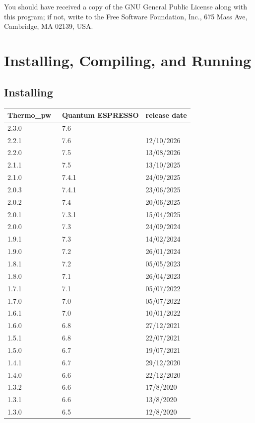 \documentclass[12pt,a4paper,twoside]{report}
\def\qe{{\sc Quantum ESPRESSO}}
\def\thermo{{\sc Thermo}\_{\sc pw}}
\begin{document}
You should have received a copy of the GNU General Public License along with this program; if not, write to the Free Software Foundation, Inc., 675 Mass Ave, Cambridge, MA 02139, USA.

\newpage
{\color{dark-blue}\chapter{Installing, Compiling, and Running}}

{\color{coral}\section{Installing}}
\color{black}
\begin{table}
\begin{center}
\begin{tabular}{lll}
\hline
\hline
\thermo\ & \qe & release date \\
\hline
2.3.0 & 7.6   &            \\
2.2.1 & 7.6   & 12/10/2026 \\
2.2.0 & 7.5   & 13/08/2026 \\
2.1.1 & 7.5   & 13/10/2025 \\
2.1.0 & 7.4.1 & 24/09/2025 \\
2.0.3 & 7.4.1 & 23/06/2025 \\
2.0.2 & 7.4 & 20/06/2025 \\
2.0.1 & 7.3.1 & 15/04/2025 \\
2.0.0 & 7.3 & 24/09/2024 \\
1.9.1 & 7.3 & 14/02/2024 \\
1.9.0 & 7.2 & 26/01/2024 \\
1.8.1 & 7.2 & 05/05/2023 \\
1.8.0 & 7.1 & 26/04/2023 \\
1.7.1 & 7.1 & 05/07/2022 \\
1.7.0 & 7.0 & 05/07/2022 \\
1.6.1 & 7.0 & 10/01/2022 \\
1.6.0 & 6.8 & 27/12/2021 \\
1.5.1 & 6.8 & 22/07/2021 \\
1.5.0 & 6.7 & 19/07/2021 \\
1.4.1 & 6.7 & 29/12/2020 \\
1.4.0 & 6.6 & 22/12/2020 \\
1.3.2 & 6.6 & 17/8/2020 \\
1.3.1 & 6.6 & 13/8/2020 \\
1.3.0 & 6.5 & 12/8/2020 \\

\end{tabular}
\end{center}
\end{table}
\end{document}
